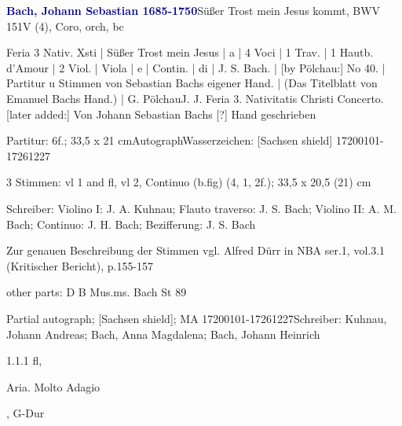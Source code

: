 \documentclass[a4paper, twocolumn, 11pt]{book}
\begin{document}
\par \vspace{16pt} \textcolor{darkblue}{\textbf{Bach, Johann Sebastian  1685-1750}}\hfillplus{[21]}\newline Süßer Trost mein Jesus kommt, BWV 151\newline V (4), Coro, orch, bc
\par \begin{itshape} Feria 3 Nativ. Xsti | Süßer Trost mein Jesus | a | 4 Voci | 1 Trav. | 1 Hautb. d'Amour | 2 Viol. | Viola | e | Contin. | di | J. S. Bach. | [by Pölchau:] No 40. | Partitur u Stimmen von Sebastian Bachs eigener Hand. | (Das Titelblatt von Emanuel Bachs Hand.) | G. Pölchau J. J. Feria 3. Nativitatis Christi Concerto. [later added:] Von Johann Sebastian Bachs [?] Hand geschrieben\end{itshape} 
\par \textcolor{darkblue}{}  Partitur: 6f.; 33,5 x 21 cm\newline Autograph\newline Wasserzeichen: [Sachsen shield]  17200101-17261227
\par \textcolor{darkblue}{}  3 Stimmen: vl 1 and fl, vl 2, {\textquotedbl}Continuo{\textquotedbl} (b.fig)  (4, 1, 2f.); 33,5 x 20,5 (21) cm\newline \begin{small} Schreiber: Violino I: J. A. Kuhnau; Flauto traverso: J. S. Bach; Violino II: A. M. Bach; Continuo: J. H. Bach; Bezifferung: J. S. Bach\end{small} \newline \begin{small} Zur genauen Beschreibung der Stimmen vgl. Alfred Dürr in NBA ser.1, vol.3.1 (Kritischer Bericht), p.155-157\end{small} \newline \begin{small} other parts: D B Mus.ms. Bach St 89\end{small} \newline Partial autograph; [Sachsen shield]; MA  17200101-17261227\newline Schreiber: Kuhnau, Johann Andreas; Bach, Anna Magdalena; Bach, Johann Heinrich
\par 1.1.1  fl, \begin{itshape}Aria. Molto Adagio\end{itshape}, G-Dur  
\end{document}
